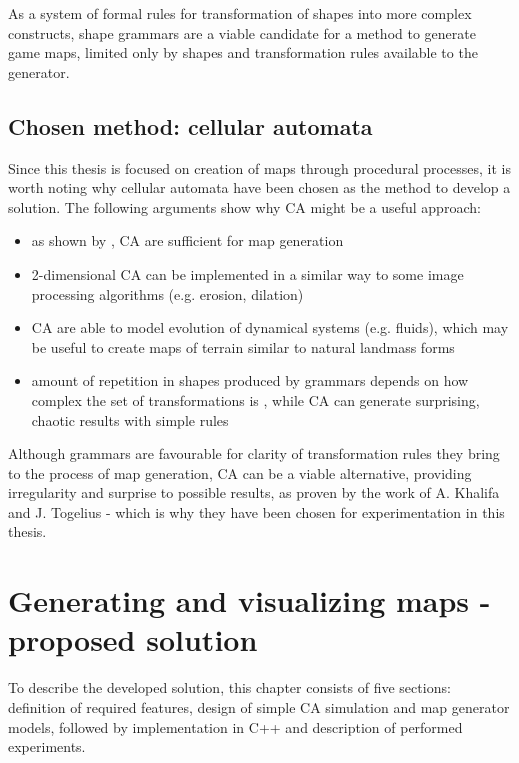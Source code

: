\documentclass[12pt]{report}
\begin{document}
As a system of formal rules for transformation of shapes into more complex constructs, shape grammars are a viable candidate for a method to generate game maps, limited only by shapes and transformation rules available to the generator.

\section{Chosen method: cellular automata}
 
Since this thesis is focused on creation of maps through procedural processes, it is worth noting why cellular automata have been chosen as the method to develop a solution. The following arguments show why CA might be a useful approach:

\begin{itemize}
	\item as shown by \autocite{johnson2010cellular}, CA are sufficient for map generation
	\item 2-dimensional CA can be implemented in a similar way to some image processing algorithms (e.g. erosion, dilation)
	\item CA are able to model evolution of dynamical systems (e.g. fluids), which may be useful to create maps of terrain similar to natural landmass forms 
	\item amount of repetition in shapes produced by grammars depends on how complex the set of transformations is \autocite{CHOMSKY1959137}, while CA can generate surprising, chaotic results with simple rules \autocite{wolfram1984cellular}
\end{itemize}

Although grammars are favourable for clarity of transformation rules they bring to the process of map generation, CA can be a viable alternative, providing irregularity and surprise to possible results, as proven by the work of A. Khalifa and J. Togelius \autocite{Khalifa2017MarahelA} - which is why they have been chosen for experimentation in this thesis.

\chapter{Generating and visualizing maps - proposed solution} \label{rozdzial.praktyka} 

To describe the developed solution, this chapter consists of five sections: definition of required features, design of simple CA simulation and map generator models, followed by implementation in C++ and description of performed experiments. 
\end{document}
